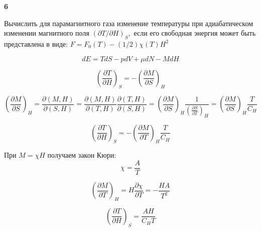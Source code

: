 \documentclass[a4paper,12pt]{article} %
\newcommand{\parder}[2]{\frac{\partial {#1}}{\partial {#2}}}
\begin{document}
\begin{ttask}\textbf{6}

Вычислить для парамагнитного газа изменение температуры при адиабатическом изменении магнитного поля $(\partial T / \partial H)_{S},$ 
если его свободная энергия может быть представлена в виде: $F=F_{0}(T)-(1 / 2) \chi(T) H^{2}$


\[ dE=TdS-pdV+\mu dN-MdH \]

\[ \left(\parder{T}{H}\right)_S=-\left(\parder{M}{S}\right)_H \]



\[ \left(\parder{M}{S}\right)_H=
\parder{(M,H)}{(S,H)}=
\parder{(M,H)}{(T,H)}\parder{(T,H)}{(S,H)}=
\left(\parder{M}{S}\right)_H \frac{1}{\left(\parder{S}{T}\right)_H}=\left(\parder{M}{S}\right)_H \frac{T}{C_H}
\]


\[ \left(\parder{T}{H}\right)_S=- \left(\parder{M}{T}\right)_H \frac{T}{C_H}\]

При $ M=\chi H$ получаем закон Кюри:
\[ \chi = \frac{A}{T} \]

\[ \left(\parder{M}{T}\right)_H= H \parder{\chi }{T}= -\frac{HA}{T^2} \]

\[ \left(\parder{T}{H}\right)_S=\frac{AH}{C_H T}\]





\end{ttask}
\end{document}
